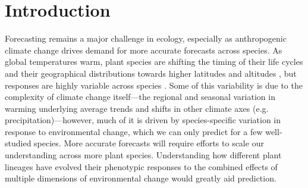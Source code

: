 \documentclass{article}\usepackage[]{graphicx}\usepackage[]{color}
\begin{document}



\section*{Introduction}

\begin{comment}
\begin{enumerate}
\item Predicting species responses to recent anthropogenic climate change presents a major challenge to ecological forecasting
\begin{enumerate}
\item On average global temperatures are warming, but there is regional and seasonal variation behind this average and shifts along other climate axes such as precipitaion are more complex than simple increases %
\item Over the past few decades empical studies have suggested that plants are shifting in their geographical distributions, moving to more northern latitudes and elevations, and shifting the timing of their life cycles
\item However, responses are highly variable across species.
\item Understanding how different species lineages have evolved their phenotypic responses to the combined effects of environmental change would greatly aid prediction
\end{enumerate}
\end{comment}
Forecasting remains a major challenge in ecology, especially as anthropogenic climate change drives demand for more accurate forecasts across species. As global temperatures warm, plant species are shifting the timing of their life cycles \citep{Cleland:2007or} and their geographical distributions towards higher latitudes and altitudes \citep{chen2011}, but responses are highly variable across species \citep{menzel2020}. Some of this variability is due to the complexity of climate change itself---the regional and seasonal variation in warming underlying average trends and shifts in other climate axes (e.g. precipitation)---however, much of it is driven by species-specific variation in response to environmental change, which we can only predict for a few well-studied species. More accurate forecasts will require efforts to scale our understanding across more plant species. Understanding how different plant lineages have evolved their phenotypic responses to the combined effects of multiple dimensions of environmental change would greatly aid prediction.\\ %
\end{document}
